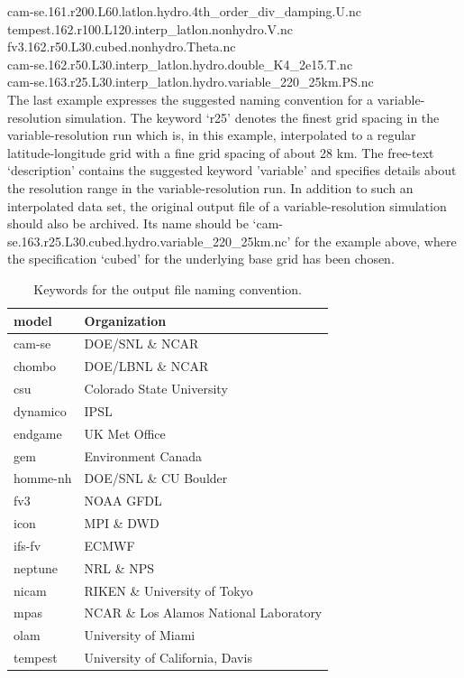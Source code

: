 \documentclass[times,doublespace]{fldauth}
\newcommand\T{\rule{0pt}{2.6ex}}
\newcommand\B{\rule[-1.2ex]{0pt}{0pt}}
\begin{document}
\noindent
cam-se.161.r200.L60.latlon.hydro.4th\_order\_div\_damping.U.nc \\
tempest.162.r100.L120.interp\_latlon.nonhydro.V.nc \\
fv3.162.r50.L30.cubed.nonhydro.Theta.nc \\
cam-se.162.r50.L30.interp\_latlon.hydro.double\_K4\_2e15.T.nc \\
cam-se.163.r25.L30.interp\_latlon.hydro.variable\_220\_25km.PS.nc \\

The last example expresses the suggested naming convention for a variable-resolution simulation. The keyword `r25' denotes the finest grid spacing in the variable-resolution run which is, in this example,  interpolated to a regular latitude-longitude grid with a fine grid spacing of about 28 km. The free-text `description' contains the suggested keyword 'variable' and specifies details about the resolution range in the variable-resolution run. In addition to such an interpolated data set, the original output file of a variable-resolution simulation should also be archived. Its name should be `cam-se.163.r25.L30.cubed.hydro.variable\_220\_25km.nc'  for the example above, where the specification `cubed' for the underlying base grid has been chosen.

\begin{table}[h]
\caption{Keywords for the output file naming convention.} \label{tab:keywords}
\begin{tabular*}{\textwidth}{ll}
\hline
model \hspace{2cm}\T \B & Organization  \\ \hline 
cam-se &  DOE/SNL \& NCAR \\
chombo &  DOE/LBNL \& NCAR \\
csu  \B & Colorado State University  \\ \hline 
dynamico & IPSL \\
endgame &  UK Met Office\\
gem & Environment Canada \\
homme-nh & DOE/SNL \& CU Boulder \\
fv3 & NOAA GFDL \\
icon & MPI \& DWD \\
ifs-fv & ECMWF \\
neptune & NRL \& NPS \\
nicam & RIKEN \& University of Tokyo \\
mpas & NCAR \& Los Alamos National Laboratory \\
olam & University of Miami \\
tempest & University of California, Davis \\
\hline 
\end{tabular*}
\end{table}
\end{document}

